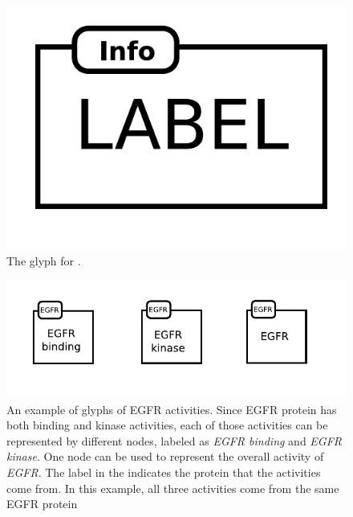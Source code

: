 \begin{figure}[H]
  \centering
  \includegraphics[scale=0.5]{images/build/biologicalActivity.pdf}
  \caption{The \AF glyph for .}
  \label{fig:af:biologicalActivity}
\end{figure}

\begin{figure}[H]
  \centering
  \includegraphics[scale = 1]{src/images/build/EGFR.pdf}
  \caption{An example of \AF glyphs of EGFR activities.  Since EGFR protein has both binding and kinase activities, each of those activities can be represented by different nodes, labeled as \emph{EGFR binding} and \emph{EGFR kinase}.  One node can be used to represent the overall activity of \emph{EGFR}.  The label in the  indicates the protein that the activities come from.  In this example, all three activities come from the same EGFR protein}
  \label{fig:af:EGFR}
\end{figure} 